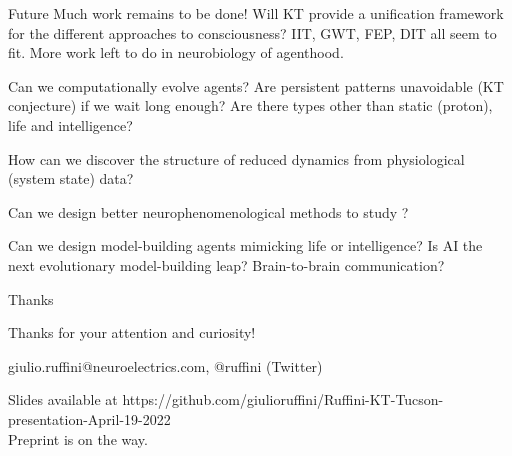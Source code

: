 \begin{frame}[label=ladila]{Future}
Much work remains to be done! Will KT provide a unification framework for the different approaches to consciousness? IIT, GWT, FEP, DIT all seem to fit. More work left to do in neurobiology of agenthood.\vfill

Can we computationally evolve agents? Are persistent patterns unavoidable (KT conjecture) if we wait long enough? Are there  types other than static (proton), life and intelligence? \vfill


How can we discover the structure of reduced dynamics from physiological (system state) data? \vfill

Can we design better neurophenomenological methods to study \SEP?   \vfill

Can we design model-building agents mimicking life or intelligence? Is AI the next evolutionary model-building leap? Brain-to-brain communication?\vfill


\end{frame}


\begin{frame}[label=ladila]{Thanks}
\vfill
\begin{center}

   {\Large Thanks for your attention and curiosity!}  \vfill
    
    giulio.ruffini@neuroelectrics.com, @ruffini (Twitter)  \vfill
    
    Slides available at https://github.com/giulioruffini/Ruffini-KT-Tucson-presentation-April-19-2022  \\
    
    Preprint is on the way.
\end{center}
\vfill

\end{frame}
